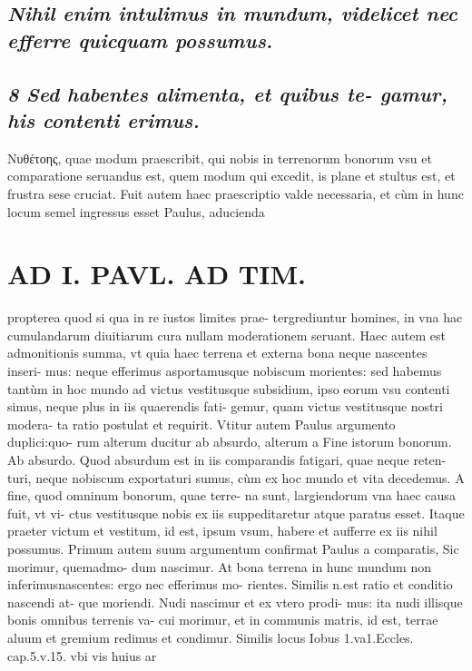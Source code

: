 \documentclass{article}
\begin{document}
\begin{pages}
\subsection*{\textit{Nihil enim intulimus in mundum, videlicet nec efferre quicquam possumus. }}
{}
\subsection*{\textit{8 Sed habentes alimenta, et quibus te- gamur, his contenti erimus. }}\pstart Νυθέτοης, quae modum praescribit, qui nobis in terrenorum bonorum vsu et comparatione seruandus est, quem modum qui excedit, is plane et stultus est, et frustra sese cruciat. Fuit autem haec praescriptio valde necessaria, et cùm in hunc locum semel ingressus esset Paulus, aducienda  \pend
\section*{AD I. PAVL. AD TIM. }
\marginpar{[ p.310. ]}\pstart propterea quod si qua in re iustos limites prae- tergrediuntur homines, in vna hac cumulandarum diuitiarum cura nullam moderationem seruant. Haec autem est admonitionis summa, vt quia haec terrena et externa bona neque nascentes inseri- mus: neque efferimus asportamusque nobiscum morientes: sed habemus tantùm in hoc mundo ad victus vestitusque subsidium, ipso eorum vsu contenti simus, neque plus in iis quaerendis fati- gemur, quam victus vestitusque nostri modera- ta ratio postulat et requirit.  \pend\pstart Vtitur autem Paulus argumento duplici:quo- rum alterum ducitur ab absurdo, alterum a Fine istorum bonorum. Ab absurdo. Quod absurdum est in iis comparandis fatigari, quae neque reten- turi, neque nobiscum exportaturi sumus, cùm ex hoc mundo et vita decedemus.  \pend\pstart A fine, quod omninum bonorum, quae terre- na sunt, largiendorum vna haec causa fuit, vt vi- ctus vestitusque nobis ex iis suppeditaretur atque  paratus esset. Itaque praeter victum et vestitum, id est, ipsum vsum, habere et aufferre ex iis nihil possumus.  \pend\pstart Primum autem suum argumentum confirmat Paulus a comparatis, Sic morimur, quemadmo- dum nascimur. At bona terrena in hunc mundum non inferimusnascentes: ergo nec efferimus mo- rientes. Similis n.est ratio et conditio nascendi at- que moriendi. Nudi nascimur et ex vtero prodi- mus: ita nudi illisque bonis omnibus terrenis va- cui morimur, et in communis matris, id est, terrae aluum et gremium redimus et condimur. Similis locus Iobus 1.va1.Eccles. cap.5.v.15. vbi vis huius ar  \pend

\end{pages}
\end{document}
